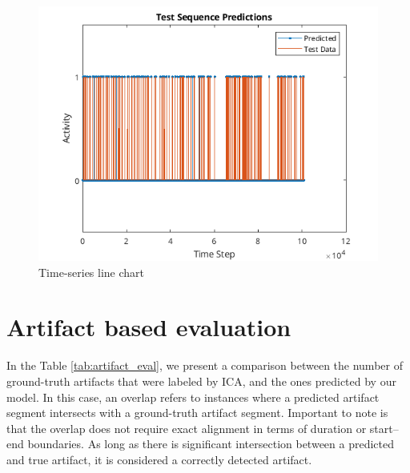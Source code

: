 \documentclass[12pt,a4paper,titlepage,openany]{report}
\begin{document}
\begin{figure}[H]
    \includegraphics[width=1\linewidth]{./new_training/test_sequence_predictions_new.png}
    \caption{Time-series line chart}
    \label{fig:time-series}
\end{figure}

\section{Artifact based evaluation}

In the Table \ref{tab:artifact_eval}, we present a comparison between the number of ground-truth artifacts that were labeled by ICA, and the ones predicted by our model. In this case, an overlap refers to instances where a predicted artifact segment intersects with a ground-truth artifact segment. Important to note is that the overlap does not require exact alignment in terms of duration or start–end boundaries. As long as there is significant intersection between a predicted and true artifact, it is considered a correctly detected artifact.
\end{document}
